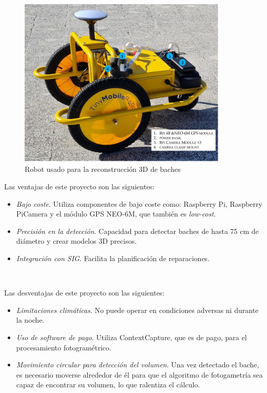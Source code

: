 \begin{figure} [h!]
	\begin{center}
		\includegraphics[width=10cm]{figs/infrarob.png}
	\end{center}
	\caption{Robot usado para la reconstrucción 3D de baches}
\label{fig:infrarob}
\end{figure}

Las ventajas de este proyecto son las siguientes: 
\begin{itemize}
	\item \textit{Bajo coste}. Utiliza componentes de bajo coste como: Raspberry Pi, Raspberry PiCamera y el módulo GPS NEO-6M, que también es \textit{low-cost}. 
	\item \textit{Precisión en la detección}. Capacidad para detectar baches de hasta 75 cm de diámetro y crear modelos 3D precisos.
	\item \textit{Integración con \acs{SIG}}. Facilita la planificación de reparaciones.
	
\end{itemize}\

Las desventajas de este proyecto son las siguientes: 
\begin{itemize}
	\item \textit{Limitaciones climáticas}. No puede operar en condiciones adversas ni durante la noche.
	\item \textit{Uso de software de pago}. Utiliza ContextCapture, que es de pago, para el procesamiento fotogramétrico.
	\item \textit{Movimiento circular para detección del volumen}. Una vez detectado el bache, es necesario moverse alrededor de él para que el algoritmo de fotogametría sea capaz de encontrar su volumen, lo que ralentiza el cálculo.
	
\end{itemize}\

